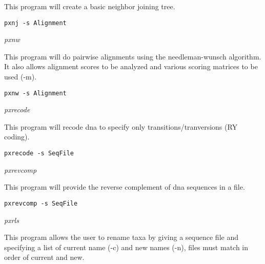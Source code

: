 \documentclass[12pt,letterpaper]{article}
\renewcommand{\subsection}[1]{%
\bigskip
\begin{center}
\begin{large}
\normalfont\itshape #1
\end{large}
\end{center}}
\begin{document}
This program will create a basic neighbor joining tree.

\begin{flushleft}
\begin{verbatim}
pxnj -s Alignment
\end{verbatim}
\end{flushleft}

\subsection{pxnw}

This program will do pairwise alignments using the needleman-wunsch algorithm. It also allows alignment scores to be analyzed and various scoring matrices to be used (-m).

\begin{flushleft}
\begin{verbatim}
pxnw -s Alignment
\end{verbatim}
\end{flushleft}

\subsection{pxrecode}

This program will recode dna to specify only transitions/tranversions (RY coding).

\begin{flushleft}
\begin{verbatim}
pxrecode -s SeqFile
\end{verbatim}
\end{flushleft}

\subsection{pxrevcomp}

This program will provide the reverse complement of dna sequences in a file.

\begin{flushleft}
\begin{verbatim}
pxrevcomp -s SeqFile
\end{verbatim}
\end{flushleft}

\subsection{pxrls}

This program allows the user to rename taxa by giving a sequence file and specifying a list of current name (-c) and new names (-n), files must match in order of current and new.
\end{document}
